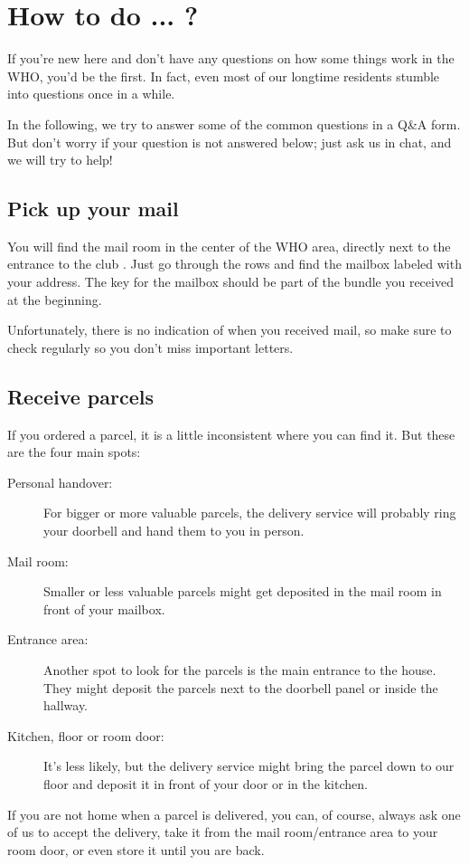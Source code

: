 \chapter{How to do ... ?} \label{chap:qna}
If you're new here and don't have any questions on how some things work in the WHO, you'd be the first. In fact, even most of our longtime residents stumble into questions once in a while.

In the following, we try to answer some of the common questions in a Q\&A form. But don't worry if your question is not answered below; just ask us in chat, and we will try to help!

\section{Pick up your mail}
You will find the mail room in the center of the WHO area, directly next to the entrance to the club . Just go through the rows and find the mailbox labeled with your address. The key for the mailbox should be part of the bundle you received at the beginning. 

Unfortunately, there is no indication of when you received mail, so make sure to check regularly so you don't miss important letters.

\section{Receive parcels}
If you ordered a parcel, it is a little inconsistent where you can find it. But these are the four main spots:
\begin{description}
    \item[Personal handover:] For bigger or more valuable parcels, the delivery service will probably ring your doorbell and hand them to you in person.
    \item[Mail room:] Smaller or less valuable parcels might get deposited in the mail room in front of your mailbox.
    \item[Entrance area:] Another spot to look for the parcels is the main entrance to the house. They might deposit the parcels next to the doorbell panel or inside the hallway.
    \item[Kitchen, floor or room door:] It's less likely, but the delivery service might bring the parcel down to our floor and deposit it in front of your door or in the kitchen.
\end{description}

If you are not home when a parcel is delivered, you can, of course, always ask one of us to accept the delivery, take it from the mail room/entrance area to your room door, or even store it until you are back.

